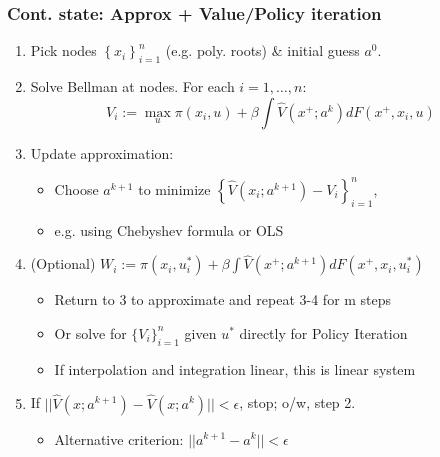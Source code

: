 \documentclass[bigger,handout]{beamer}
\begin{document}
\begin{frame}%
\frametitle{Cont. state: Approx + Value/Policy iteration}

\begin{enumerate}
\item Pick nodes $\left\{ x_{i}\right\} _{i=1}^{n}$ (e.g. poly. roots) \&
initial guess $a^{0}$.

\item Solve Bellman at nodes. For each $i=1,\ldots ,n$:
\begin{equation*}
V_{i}:=\max_{u}\pi (x_{i},u)+\beta \int \hat{V}(x^{+};a^{k})dF(x^{+},x_{i},u)
\end{equation*}

\item Update approximation:

\begin{itemize}
\item Choose $a^{k+1}$ to minimize $\left\{ \hat{V}(x_{i};a^{k+1})-V_{i}%
\right\} _{i=1}^{n}$,

\item e.g. using Chebyshev formula or OLS
\end{itemize}

\item (Optional) $W_i:=\pi (x_{i},u_i^*)+\beta \int \hat{V}(x^{+};a^{k+1})dF(x^{+},x_{i},u_i^*)$
\begin{itemize}
\item Return to 3 to approximate and repeat 3-4 for m steps
\item Or solve for $\{V_i\}_{i=1}^{n}$ given $u^*$ directly for Policy Iteration
\item If interpolation and integration linear, this is linear system
\end{itemize}

\item If $||\hat{V}(x;a^{k+1})-\hat{V}(x;a^{k})||<\epsilon $, stop; o/w,
step 2.

\begin{itemize}
\item Alternative criterion: $||a^{k+1}-a^{k}||<\epsilon $
\end{itemize}
\end{enumerate}

\end{frame}%
\end{document}
